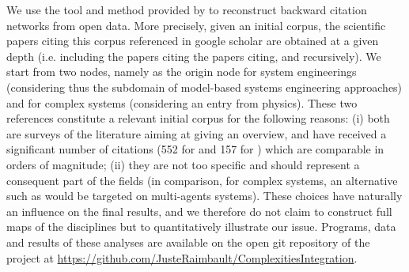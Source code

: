 \documentclass[runningheads,a4paper]{llncs2e/llncs}
\begin{document}

We use the tool and method provided by \cite{raimbault2017exploration} to reconstruct backward citation networks from open data. More precisely, given an initial corpus, the scientific papers citing this corpus referenced in google scholar are obtained at a given depth (i.e. including the papers citing the papers citing, and recursively). We start from two nodes, namely \cite{estefan2007survey} as the origin node for system engineerings (considering thus the subdomain of model-based systems engineering approaches) and \cite{newman2011complex} for complex systems (considering an entry from physics). These two references constitute a relevant initial corpus for the following reasons: (i) both are surveys of the literature aiming at giving an overview, and have received a significant number of citations (552 for \cite{estefan2007survey} and 157 for \cite{newman2011complex}) which are comparable in orders of magnitude; (ii) they are not too specific and should represent a consequent part of the fields (in comparison, for complex systems, an alternative such as \cite{stone2000multiagent} would be targeted on multi-agents systems). These choices have naturally an influence on the final results, and we therefore do not claim to construct full maps of the disciplines but to quantitatively illustrate our issue. Programs, data and results of these analyses are available on the open git repository of the project at \url{https://github.com/JusteRaimbault/ComplexitiesIntegration}.
\end{document}
